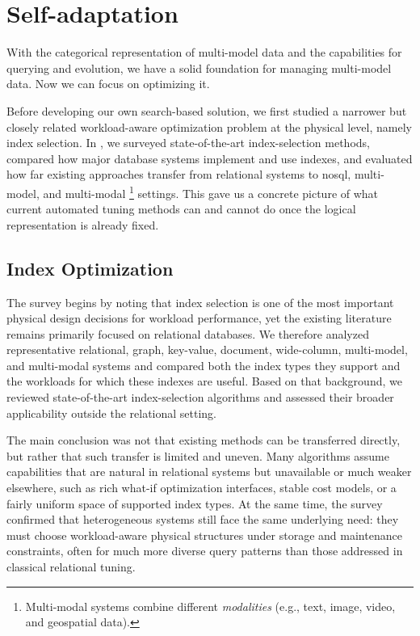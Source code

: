 \section{Self-adaptation}
\label{sec:self-adaptation}

With the categorical representation of multi-model data and the capabilities for querying and evolution, we have a solid foundation for managing multi-model data. Now we can focus on optimizing it.

Before developing our own search-based solution, we first studied a narrower but closely related workload-aware optimization problem at the physical level, namely index selection. In , we surveyed state-of-the-art index-selection methods, compared how major database systems implement and use indexes, and evaluated how far existing approaches transfer from relational systems to \acrshort{nosql}, multi-model, and multi-modal%
\footnote{Multi-modal systems combine different \emph{modalities} (e.g., text, image, video, and geospatial data).}
settings. This gave us a concrete picture of what current automated tuning methods can and cannot do once the logical representation is already fixed.

\subsection{Index Optimization}

The survey begins by noting that index selection is one of the most important physical design decisions for workload performance, yet the existing literature remains primarily focused on relational databases. We therefore analyzed representative relational, graph, key-value, document, wide-column, multi-model, and multi-modal systems and compared both the index types they support and the workloads for which these indexes are useful. Based on that background, we reviewed state-of-the-art index-selection algorithms and assessed their broader applicability outside the relational setting.

The main conclusion was not that existing methods can be transferred directly, but rather that such transfer is limited and uneven. Many algorithms assume capabilities that are natural in relational systems but unavailable or much weaker elsewhere, such as rich what-if optimization interfaces, stable cost models, or a fairly uniform space of supported index types. At the same time, the survey confirmed that heterogeneous systems still face the same underlying need: they must choose workload-aware physical structures under storage and maintenance constraints, often for much more diverse query patterns than those addressed in classical relational tuning.

